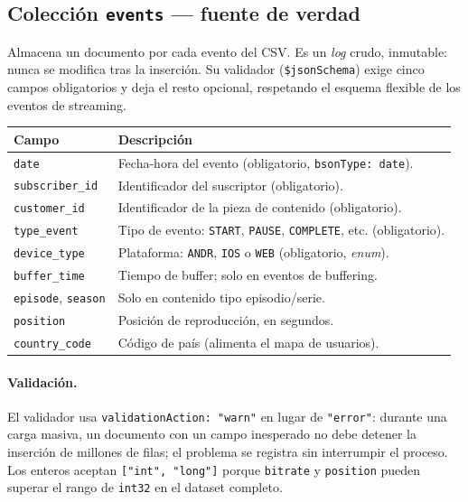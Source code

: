 \documentclass[12pt, letterpaper]{article}
\newcommand{\code}[1]{\texttt{#1}}
\begin{document}
\subsection{Colección \code{events} — fuente de verdad}
Almacena un documento por cada evento del CSV. Es un \emph{log} crudo,
inmutable: nunca se modifica tras la inserción. Su validador
(\code{\$jsonSchema}) exige cinco campos obligatorios y deja el resto
opcional, respetando el esquema flexible de los eventos de streaming.

\begin{center}
\begin{tabular}{@{}lL{8.5cm}@{}}
\toprule
\textbf{Campo} & \textbf{Descripción} \\
\midrule
\code{date} & Fecha-hora del evento (obligatorio, \code{bsonType: date}). \\
\code{subscriber\_id} & Identificador del suscriptor (obligatorio). \\
\code{customer\_id} & Identificador de la pieza de contenido (obligatorio). \\
\code{type\_event} & Tipo de evento: \code{START}, \code{PAUSE}, \code{COMPLETE}, etc. (obligatorio). \\
\code{device\_type} & Plataforma: \code{ANDR}, \code{IOS} o \code{WEB} (obligatorio, \emph{enum}). \\
\code{buffer\_time} & Tiempo de buffer; solo en eventos de buffering. \\
\code{episode}, \code{season} & Solo en contenido tipo episodio/serie. \\
\code{position} & Posición de reproducción, en segundos. \\
\code{country\_code} & Código de país (alimenta el mapa de usuarios). \\
\bottomrule
\end{tabular}
\end{center}

\paragraph{Validación.} El validador usa \code{validationAction: "warn"} en
lugar de \code{"error"}: durante una carga masiva, un documento con un campo
inesperado no debe detener la inserción de millones de filas; el problema se
registra sin interrumpir el proceso. Los enteros aceptan
\code{["int", "long"]} porque \code{bitrate} y \code{position} pueden superar el
rango de \code{int32} en el dataset completo.
\end{document}
